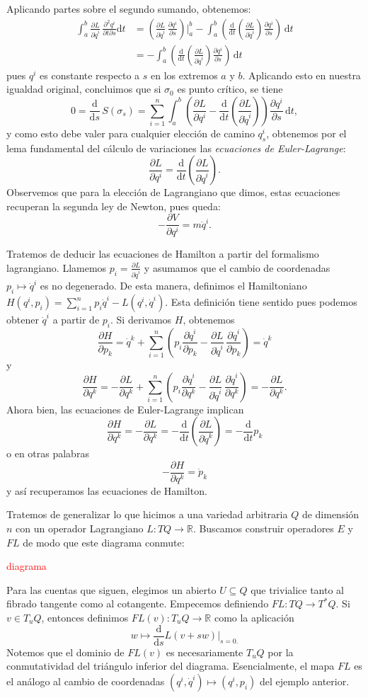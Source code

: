 \documentclass[11pt, a4paper]{article}
\newcommand{\RR}{\mathbb{R}}
\newcommand{\dd}{\mathrm{d}}
\newcommand{\ddt}{\frac{\dd}{\dd t}}
\newcommand{\dds}{\frac{\dd}{\dd s}}
\newcommand{\pardev}[2]{\frac{\partial #1}{\partial #2}}
\theoremstyle{plain}
\theoremstyle{definition}
\begin{document}
Aplicando partes sobre el segundo sumando, obtenemos:
\begin{align*}
\int_a^b \pardev{L}{\dot{q}^i}\,\frac{\partial^2 q^i}{\partial t\partial s}\dd t &= \left(\pardev{L}{\dot{q}^i}\,\pardev{q^i}{s}\right)\bigg|_a^b - \int_a^b \left(\ddt\!\left(\pardev{L}{\dot{q}^i}\right)\pardev{q^i}{s}\right)\,\dd t\\
&=- \int_a^b \left(\ddt\!\left(\pardev{L}{\dot{q}^i}\right)\pardev{q^i}{s}\right)\,\dd t
\end{align*}
pues $q^i$ es constante respecto a $s$ en los extremos $a$ y $b$. Aplicando esto en nuestra igualdad original, concluimos que si $\sigma_0$ es punto crítico, se tiene
\[0=\dds\,S(\sigma_s) = \sum_{i=1}^n \int_a^b  \left(\pardev{L}{q^i} - \ddt\!\left(\pardev{L}{\dot{q}^i} \right) \right)\pardev{q^i}{s}\, \dd t,\]
y como esto debe valer para cualquier elección de camino $q_s^i$, obtenemos por el lema fundamental del cálculo de variaciones las \emph{ecuaciones de Euler-Lagrange}:
\[\pardev{L}{q^i} = \ddt\!\left(\pardev{L}{\dot{q}^i}\right).\]
Observemos que para la elección de Lagrangiano que dimos, estas ecuaciones recuperan la segunda ley de Newton, pues queda:
\[-\pardev{V}{q^i} = m\ddot{q}^i.\]

Tratemos de deducir las ecuaciones de Hamilton a partir del formalismo lagrangiano. Llamemos $p_i=\pardev{L}{\dot{q}^i}$ y asumamos que el cambio de coordenadas $p_i\mapsto \dot{q}^i$ es no degenerado. De esta manera, definimos el Hamiltoniano $H(q^i,p_i) = \sum_{i=1}^n p_i\dot{q}^i - L(q^i,\dot{q}^i)$. Esta definición tiene sentido pues podemos obtener $\dot{q}^i$ a partir de $p_i$. Si derivamos $H$, obtenemos
\[\pardev{H}{p_k} = \dot{q}^k + \sum_{i=1}^n \left(p_i\pardev{\dot{q}^i}{p_k} -\pardev{L}{\dot{q}^i}\,\pardev{\dot{q}^i}{p_k}\right)=\dot{q}^k\]
y
\[\pardev{H}{q^k} =  -\pardev{L}{q^k}+\sum_{i=1}^n \left(p_i\pardev{\dot{q}^i}{q^k}-\pardev{L}{\dot{q}^i}\,\pardev{\dot{q}^i}{q^k}\right)=-\pardev{L}{q^k}.\]
Ahora bien, las ecuaciones de Euler-Lagrange implican
\[\pardev{H}{q^k}=-\pardev{L}{q^k}=-\ddt\!\left(\pardev{L}{\dot{q}^k}\right) = -\ddt p_k\]
o en otras palabras
\[-\pardev{H}{q^k}=\dot{p}_k\]
y así recuperamos las ecuaciones de Hamilton.

Tratemos de generalizar lo que hicimos a una variedad arbitraria $Q$ de dimensión $n$ con un operador Lagrangiano $L:TQ\to \RR$. Buscamos construir operadores $E$ y $FL$ de modo que este diagrama conmute:

\textcolor{red}{diagrama}

Para las cuentas que siguen, elegimos un abierto $U\subseteq Q$ que trivialice tanto al fibrado tangente como al cotangente. Empecemos definiendo $FL:TQ\to T^*Q$. Si $v\in T_uQ$, entonces definimos $FL(v):T_uQ\to\RR$ como la aplicación
\[w\mapsto \dds L(v+sw)\bigg|_{s=0.}\]
Notemos que el dominio de $FL(v)$ es necesariamente $T_uQ$ por la conmutatividad del triángulo inferior del diagrama. Esencialmente, el mapa $FL$ es el análogo al cambio de coordenadas $(q^i,\dot{q}^i)\mapsto (q^i,p_i)$ del ejemplo anterior.
\end{document}
